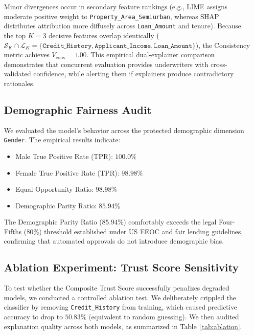 \documentclass[conference]{IEEEtran}
\begin{document}
Minor divergences occur in secondary feature rankings (e.g., LIME assigns moderate positive weight to \texttt{Property\_Area\_Semiurban}, whereas SHAP distributes attribution more diffusely across \texttt{Loan\_Amount} and tenure). Because the top $K=3$ decisive features overlap identically ($\mathcal{S}_K \cap \mathcal{L}_K = \{\texttt{Credit\_History}, \texttt{Applicant\_Income}, \texttt{Loan\_Amount}\}$), the Consistency metric achieves $V_{\text{cons}} = 1.00$. This empirical dual-explainer comparison demonstrates that concurrent evaluation provides underwriters with cross-validated confidence, while alerting them if explainers produce contradictory rationales.

\subsection{Demographic Fairness Audit}
We evaluated the model's behavior across the protected demographic dimension \texttt{Gender}. The empirical results indicate:
\begin{itemize}
    \item Male True Positive Rate (TPR): $100.0\%$
    \item Female True Positive Rate (TPR): $98.98\%$
    \item Equal Opportunity Ratio: $98.98\%$
    \item Demographic Parity Ratio: $85.94\%$
\end{itemize}
The Demographic Parity Ratio ($85.94\%$) comfortably exceeds the legal Four-Fifths (80\%) threshold established under US EEOC and fair lending guidelines, confirming that automated approvals do not introduce demographic bias.

\subsection{Ablation Experiment: Trust Score Sensitivity}
To test whether the Composite Trust Score successfully penalizes degraded models, we conducted a controlled ablation test. We deliberately crippled the classifier by removing \texttt{Credit\_History} from training, which caused predictive accuracy to drop to $50.83\%$ (equivalent to random guessing). We then audited explanation quality across both models, as summarized in Table~\ref{tab:ablation}.
\end{document}
